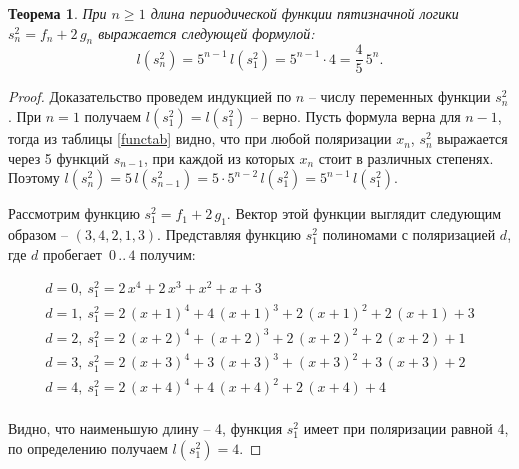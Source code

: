 \documentclass[a4paper, 12pt]{article}
\newtheorem{myth}{Теорема}
\begin{document}
\begin{myth}
При $n \geqslant 1$ длина периодической функции пятизначной логики $s^2_n = f_n + 2\,g_n$ выражается следующей формулой:
$$ l(s^2_n) = 5^{n-1}\,l(s^2_1) = 5^{n-1} \cdot 4 = \frac{4}{5}\,5^n.$$
\end{myth}
\begin{proof}
Доказательство проведем индукцией по $n$ -- числу переменных функции $s^2_n$.
При $n = 1$ получаем $l(s^2_1) = l(s^2_1)$ -- верно.
Пусть формула верна для $n-1$, тогда из таблицы \ref{functab} видно, что при любой поляризации $x_n$, $s^2_n$ выражается
через 5 функций $s_{n-1}$, при каждой из которых $x_n$ стоит в различных степенях.
Поэтому $l(s^2_n) = 5\,l(s^2_{n-1}) = 5\cdot5^{n-2}\,l(s^2_1) = 5^{n-1}\,l(s^2_1)$.

Рассмотрим функцию $s^2_1 = f_1 + 2\,g_1$. Вектор этой функции выглядит следующим образом -- $(3,4,2,1,3)$.
Представляя функцию $s^2_1$ полиномами с поляризацией $d$, где $d$ пробегает~$0\,..\,4$ получим:

$$
\begin{array}{l}
d = 0, \ s^2_1 = 2\,x^4 + 2\,x^3 + x^2 + x + 3 \\

d = 1, \ s^2_1 = 2\,(x+1)^4 + 4\,(x+1)^3 + 2\,(x+1)^2 + 2\,(x+1) + 3 \\

d = 2, \ s^2_1 = 2\,(x+2)^4 + (x+2)^3 + 2\,(x+2)^2 + 2\,(x+2) + 1 \\

d = 3, \ s^2_1 = 2\,(x+3)^4 + 3\,(x+3)^3 + (x+3)^2 + 3\,(x+3) + 2 \\

d = 4, \ s^2_1 = 2\,(x+4)^4 + 4\,(x+4)^2 + 2\,(x+4) + 4 \\
\end{array}
$$

Видно, что наименьшую длину -- 4, функция $s^2_1$ имеет при поляризации равной 4, по определению получаем  $l(s^2_1) = 4$.
\end{proof}
\end{document}
